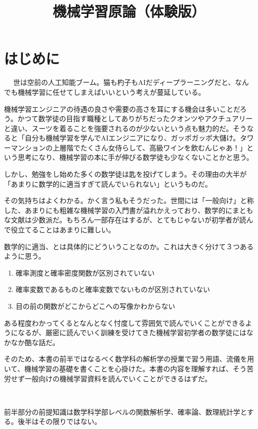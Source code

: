 \documentclass[dvipdfmx, a4paper]{jsarticle}
\title{機械学習原論（体験版）}
\author{}
\begin{document}
\maketitle

\section{はじめに}　
世は空前の人工知能ブーム。猫も杓子もAIだディープラーニングだと、なんでも機械学習に任せてしまえばいいという考えが蔓延している。

機械学習エンジニアの待遇の良さや需要の高さを耳にする機会は多いことだろう。かつて数学徒の目指す職種としてありがちだったクオンツやアクチュアリーと違い、スーツを着ることを強要されるのが少ないという点も魅力的だ。そうなると「自分も機械学習を学んでAIエンジニアになり、ガッポガッポ大儲け。タワーマンションの上層階でたくさん女侍らして、高級ワインを飲むんじゃあ！」という思考になり、機械学習の本に手が伸びる数学徒も少なくないことかと思う。

しかし、勉強をし始めた多くの数学徒は匙を投げてしまう。その理由の大半が「あまりに数学的に適当すぎて読んでいられない」というものだ。

その気持ちはよくわかる。かく言う私もそうだった。世間には「一般向け」と称した、あまりにも粗雑な機械学習の入門書が溢れかえっており、数学的にまともな文献は少数派だ。もちろん一部存在はするが、とてもじゃないが初学者が読んで役立てることはあまりに難しい。

数学的に適当、とは具体的にどういうことなのか。これは大きく分けて３つあるように思う。

\begin{enumerate}
\item 確率測度と確率密度関数が区別されていない
\item 確率変数であるものと確率変数でないものが区別されていない
\item 目の前の関数がどこからどこへの写像かわからない
\end{enumerate}

ある程度わかってくるとなんとなく忖度して雰囲気で読んでいくことができるようになるが、厳密に読んでいく訓練を受けてきた機械学習初学者の数学徒にはなかなか酷な話だ。

そのため、本書の前半ではなるべく数学科の解析学の授業で習う用語、流儀を用いて、機械学習の基礎を書くことを心掛けた。本書の内容を理解すれば、そう苦労せず一般向けの機械学習資料を読んでいくことができるはずだ。

　

前半部分の前提知識は数学科学部レベルの関数解析学、確率論、数理統計学とする。後半はその限りではない。
\end{document}
